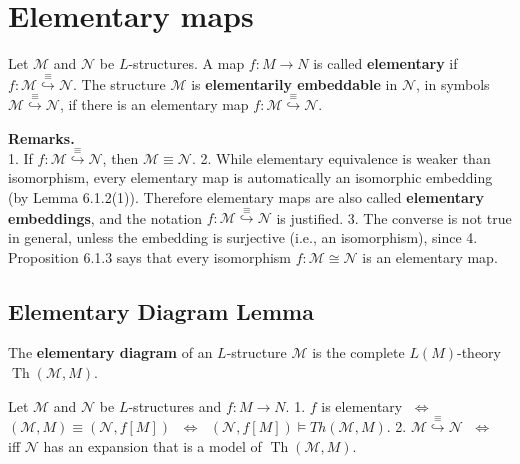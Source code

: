 \documentclass[a4paper,UKenglish,cleveref,autoref,thm-restate,12pt]{lipics-v2021-wjd}
\newcommand{\<}{\langle}
\renewcommand{\>}{\rangle}
\begin{document}
\section{Elementary maps}\label{elementary-maps}

Let \(\mathcal M\) and \(\mathcal N\) be \(L\)-structures. A map
\(f \colon M \to N\) is called \textbf{elementary} if
\(f \colon \mathcal M \stackrel{\equiv}{\hookrightarrow} \mathcal N\).
The structure \(\mathcal M\) is \textbf{elementarily embeddable} in
\(\mathcal N\), in symbols
\(\mathcal M \stackrel{\equiv}{\hookrightarrow} \mathcal N\), if there
is an elementary map
\(f \colon \mathcal M \stackrel{\equiv}{\hookrightarrow} \mathcal N\).

\textbf{Remarks.}\\
1. If
\(f \colon \mathcal M \stackrel{\equiv}{\hookrightarrow} \mathcal N\),
then \(\mathcal M \equiv \mathcal N\). 2. While elementary equivalence
is weaker than isomorphism, every elementary map is automatically an
isomorphic embedding (by Lemma 6.1.2(1)). Therefore elementary maps are
also called \textbf{elementary embeddings}, and the notation
\(f \colon \mathcal M \stackrel{\equiv}{\hookrightarrow} \mathcal N\) is
justified. 3. The converse is not true in general, unless the embedding
is surjective (i.e., an isomorphism), since 4. Proposition 6.1.3 says
that every isomorphism \(f \colon \mathcal M \cong \mathcal N\) is an
elementary map.


\subsection{Elementary Diagram Lemma}\label{elementary-diagram-lemma}

The \textbf{elementary diagram} of an \(L\)-structure \(\mathcal M\) is
the complete \(L(M)\)-theory \(\operatorname{Th}(\mathcal M, M)\).

\begin{lemma}
 Let \(\mathcal M\) and
\(\mathcal N\) be \(L\)-structures and \(f \colon M \rightarrow N\). 1.
\(f\) is elementary \(\; \Leftrightarrow \;\)
\((\mathcal M, M) \equiv (\mathcal N, f[M])\) \(\; \Leftrightarrow \;\)
\((\mathcal N, f[M]) \vDash Th(\mathcal M, M)\). 2.
\(\mathcal M \stackrel{\equiv}{\hookrightarrow} \mathcal N\)
\(\; \Leftrightarrow \;\) iff \(\mathcal N\) has an expansion that is a
model of \(\operatorname{Th}(\mathcal M, M)\).
\end{lemma}



\end{document}
